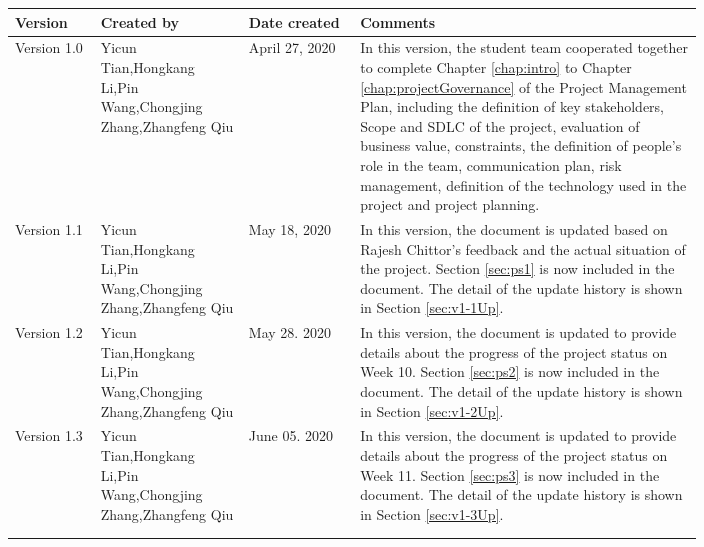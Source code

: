 \begin{tabularx}{0.95\linewidth}{%
  >{\raggedright\arraybackslash}p{0.1\linewidth}%
  >{\raggedright\arraybackslash}p{0.17\linewidth}%
  >{\raggedright\arraybackslash}p{0.13\linewidth}%
  >{\raggedright\arraybackslash}p{0.40\linewidth}
  }
  \toprule
  Version & Created by & Date created & Comments\\
  \midrule
  Version 1.0
  & Yicun Tian,\newline Hongkang Li,\newline Pin Wang,\newline Chongjing Zhang,\newline Zhangfeng Qiu
  & April 27, 2020
  & In this version, the student team cooperated together to complete Chapter \ref{chap:intro} to Chapter \ref{chap:projectGovernance} of the Project Management Plan, including the definition of key stakeholders, Scope and SDLC of the project, evaluation of business value, constraints, the definition of people's role in the team, communication plan, risk management, definition of the technology used in the project and project planning.
  \\
  \midrule
  Version 1.1
  & Yicun Tian,\newline Hongkang Li,\newline Pin Wang,\newline Chongjing Zhang,\newline Zhangfeng Qiu
  & May 18, 2020
  & In this version, the document is updated based on Rajesh Chittor's feedback and the actual situation of the project. Section \ref{sec:ps1} is now included in the document. The detail of the update history is shown in Section \ref{sec:v1-1Up}.
  \\
  \midrule
  Version 1.2
  & Yicun Tian,\newline Hongkang Li,\newline Pin Wang,\newline Chongjing Zhang,\newline Zhangfeng Qiu
  & May 28. 2020
  & In this version, the document is updated to provide details about the progress of the project status on Week 10. Section \ref{sec:ps2} is now included in the document. The detail of the update history is shown in Section \ref{sec:v1-2Up}.
  \\
  \midrule
  Version 1.3
  & Yicun Tian,\newline Hongkang Li,\newline Pin Wang,\newline Chongjing Zhang,\newline Zhangfeng Qiu
  & June 05. 2020
  & In this version, the document is updated to provide details about the progress of the project status on Week 11. Section \ref{sec:ps3} is now included in the document. The detail of the update history is shown in Section \ref{sec:v1-3Up}.
  \\
  \bottomrule
  \\
  \caption{Evolution of document}  
  \label{tab:evolutionOfDocument}
\end{tabularx}

